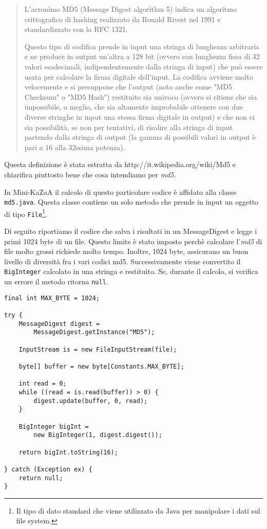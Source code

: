 \begin{quotation}
L'acronimo MD5 (Message Digest algorithm 5) indica un algoritmo crittografico di hashing realizzato da Ronald Rivest nel 1991 e standardizzato con la RFC 1321.

Questo tipo di codifica prende in input una stringa di lunghezza arbitraria e ne produce in output un'altra a 128 bit (ovvero con lunghezza fissa di 32 valori esadecimali, indipendentemente dalla stringa di input) che può essere usata per calcolare la firma digitale dell'input. La codifica avviene molto velocemente e si presuppone che l'output (noto anche come "MD5 Checksum" o "MD5 Hash") restituito sia univoco (ovvero si ritiene che sia impossibile, o meglio, che sia altamente improbabile ottenere con due diverse stringhe in input una stessa firma digitale in output) e che non ci sia possibilità, se non per tentativi, di risalire alla stringa di input partendo dalla stringa di output (la gamma di possibili valori in output è pari a 16 alla 32esima potenza).\end{quotation} 

Questa definizione è stata estratta da http://it.wikipedia.org/wiki/Md5 e chiarifica piuttosto bene che cosa intendiamo per \emph{md5}.

In Mini-KaZaA il calcolo di questo particolare codice è affidato alla classe \verb|md5.java|.
Questa classe contiene un solo metodo che prende in input un oggetto di tipo \verb|File|\footnote{Il tipo di dato standard che viene utilizzato da Java per manipolare i dati sul file system.}.

Di seguito riportiamo il codice che salva i risultati in un MessageDigest e legge i primi 1024 byte di un file. Questo limite è stato imposto perchè calcolare l'\emph{md5} di file molto grossi richiede molto tempo. Inoltre, 1024 byte, assicurano un buon livello di diversità fra i vari codici md5.
Successivamente viene convertito il \verb|BigInteger| calcolato in una stringa e restituito.
Se, durante il calcolo, si verifica un errore il metodo ritorna \verb|null|.
\begin{lstlisting}
final int MAX_BYTE = 1024;

try {
	MessageDigest digest = 
		MessageDigest.getInstance("MD5");
		
	InputStream is = new FileInputStream(file);
	
	byte[] buffer = new byte[Constants.MAX_BYTE];
	
	int read = 0;
	while ((read = is.read(buffer)) > 0) {
		digest.update(buffer, 0, read);
	}

	BigInteger bigInt = 
		new BigInteger(1, digest.digest());

	return bigInt.toString(16);

} catch (Exception ex) {
	return null;
}
\end{lstlisting}

